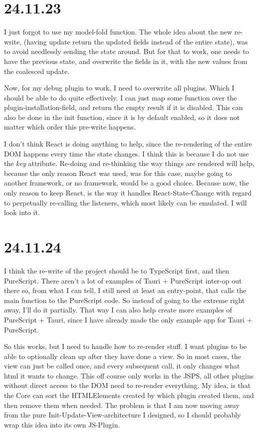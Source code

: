 \section{24.11.23}

I just forgot to use my model-fold function. The whole idea about the new
re-write, (having update return the updated fields instead of the entire
state), was to avoid needlessly sending the state around. But for that to work,
one needs to have the previous state, and overwrite the fields in it, with the
new values from the coalesced update.

Now, for my debug plugin to work, I need to overwrite all plugins. Which I
should be able to do quite effectively. I can just map some function over the
plugin-installation-field, and return the empty result if it is disabled. This
can also be done in the init function, since it is by default enabled, so it
does not matter which order this pre-write happens.

I don't think React is doing anything to help, since the re-rendering of the
entire DOM happens every time the state changes. I think this is because I do
not use the \textit{key} attribute. Re-doing and re-thinking the way things are
rendered will help, because the only reason React was used, was for this case,
maybe going to another framework, or no framework, would be a good choice.
Because now, the only reason to keep React, is the way it handles
React-State-Change with regard to perpetually re-calling the listeners, which
most likely can be emulated. I will look into it.


\section{24.11.24}

I think the re-write of the project should be to TypeScript first, and then
PureScript. There aren't a lot of examples of Tauri + PureScript inter-op out
there so, from what I can tell, I still need at least an entry-point, that calls
the main function to the PureScript code. So instead of going to the extreme
right away, I'll do it partially. That way I can also help create more examples
of PureScript + Tauri, since I have already made the only example app for Tauri
+ PureScript.

So this works, but I need to handle how to re-render stuff. I want plugins to
be able to optionally clean up after they have done a view. So in most cases,
the view can just be called once, and every subsequent call, it only changes what
html it wants to change. This off course only works in the JSPS, all other
plugins without direct access to the DOM need to re-render everything. My idea,
is that the Core can sort the HTMLElements created by which plugin created them,
and then remove them when needed. The problem is that I am now moving away from
the pure Init-Update-View-architecture I designed, so I should probably wrap
this idea into its own JS-Plugin.


